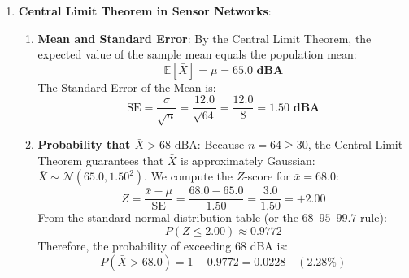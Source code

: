 \begin{enumerate}
    \item \textbf{Central Limit Theorem in Sensor Networks}:
    \begin{enumerate}[label=(\alph*)]
        \item \textbf{Mean and Standard Error}:
        By the Central Limit Theorem, the expected value of the sample mean equals the population mean:
        \begin{equation*}
        \mathbb{E}[\bar{X}] = \mu = \mathbf{65.0\text{ dBA}}
        \end{equation*}
        The Standard Error of the Mean is:
        \begin{equation*}
        \text{SE} = \frac{\sigma}{\sqrt{n}} = \frac{12.0}{\sqrt{64}} = \frac{12.0}{8} = \mathbf{1.50\text{ dBA}}
        \end{equation*}
        \item \textbf{Probability that $\bar{X} > 68\text{ dBA}$}:
        Because $n = 64 \ge 30$, the Central Limit Theorem guarantees that $\bar{X}$ is approximately Gaussian: $\bar{X} \sim \mathcal{N}(65.0, 1.50^2)$.
        We compute the $Z$-score for $\bar{x} = 68.0$:
        \begin{equation*}
        Z = \frac{\bar{x} - \mu}{\text{SE}} = \frac{68.0 - 65.0}{1.50} = \frac{3.0}{1.50} = \mathbf{+2.00}
        \end{equation*}
        From the standard normal distribution table (or the $68$--$95$--$99.7$ rule):
        \begin{equation*}
        P(Z \le 2.00) \approx 0.9772
        \end{equation*}
        Therefore, the probability of exceeding $68\text{ dBA}$ is:
        \begin{equation*}
        P(\bar{X} > 68.0) = 1 - 0.9772 = \mathbf{0.0228} \quad (\mathbf{2.28\%})
        \end{equation*}
    \end{enumerate}


\end{enumerate}

